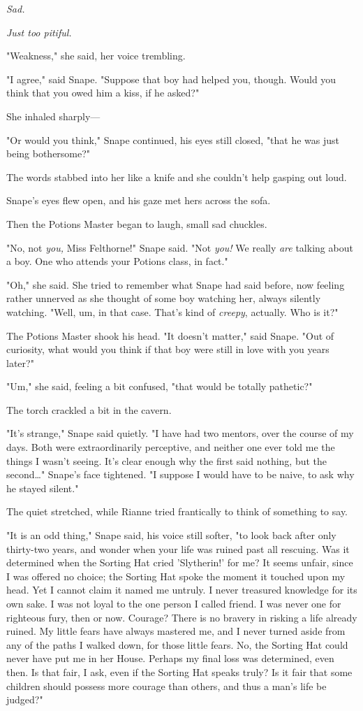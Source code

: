 \emph{Sad.}

\emph{Just too pitiful.}

"Weakness," she said, her voice trembling.

"I agree," said Snape. "Suppose that boy had helped you, though. Would you 
think that you owed him a kiss, if he asked?"

She inhaled sharply---

"Or would you think," Snape continued, his eyes still closed, "that he was just 
being bothersome?"

The words stabbed into her like a knife and she couldn't help gasping out loud.

Snape's eyes flew open, and his gaze met hers across the sofa.

Then the Potions Master began to laugh, small sad chuckles.

"No, not \emph{you,} Miss Felthorne!" Snape said. "Not \emph{you!} We really 
\emph{are} talking about a boy. One who attends your Potions class, in fact."

"Oh," she said. She tried to remember what Snape had said before, now feeling 
rather unnerved as she thought of some boy watching her, always silently 
watching. "Well, um, in that case. That's kind of \emph{creepy}, actually. Who 
is it?"

The Potions Master shook his head. "It doesn't matter," said Snape. "Out of 
curiosity, what would you think if that boy were still in love with you years 
later?"

"Um," she said, feeling a bit confused, "that would be totally pathetic?"

The torch crackled a bit in the cavern.

"It's strange," Snape said quietly. "I have had two mentors, over the course of 
my days. Both were extraordinarily perceptive, and neither one ever told me the 
things I wasn't seeing. It's clear enough why the first said nothing, but the 
second{\ldots}" Snape's face tightened. "I suppose I would have to be naive, to 
ask why he stayed silent."

The quiet stretched, while Rianne tried frantically to think of something to 
say.

"It is an odd thing," Snape said, his voice still softer, "to look back after 
only thirty-two years, and wonder when your life was ruined past all rescuing. 
Was it determined when the Sorting Hat cried 'Slytherin!' for me? It seems 
unfair, since I was offered no choice; the Sorting Hat spoke the moment it 
touched upon my head. Yet I cannot claim it named me untruly. I never treasured 
knowledge for its own sake. I was not loyal to the one person I called friend. 
I was never one for righteous fury, then or now. Courage? There is no bravery 
in risking a life already ruined. My little fears have always mastered me, and 
I never turned aside from any of the paths I walked down, for those little 
fears. No, the Sorting Hat could never have put me in her House. Perhaps my 
final loss was determined, even then. Is that fair, I ask, even if the Sorting 
Hat speaks truly? Is it fair that some children should possess more courage 
than others, and thus a man's life be judged?"

